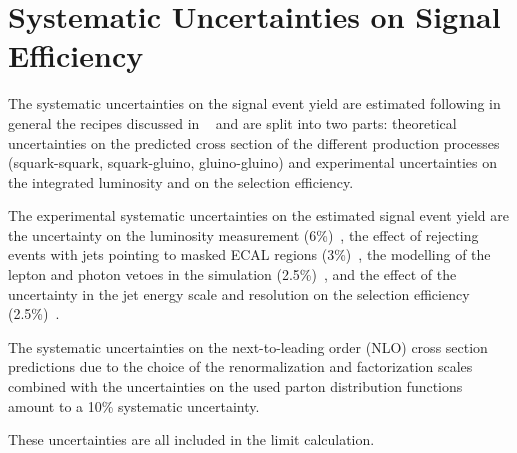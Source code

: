 \section{Systematic Uncertainties on Signal Efficiency \label{sec:systematics}}



The systematic uncertainties on the signal event yield are estimated following in general the recipes discussed in ~\cite{RA1Paper} and are split
into two parts: theoretical uncertainties on the predicted
cross section of the different production processes (squark-squark,
squark-gluino, gluino-gluino) and experimental uncertainties on
the integrated luminosity and on the selection efficiency.

The experimental systematic uncertainties on the estimated signal event yield are the uncertainty on the
luminosity measurement (6\%)~\cite{ref:lumi}, the effect of rejecting
events with jets pointing to masked ECAL regions (3\%)~\cite{RA1Paper}, the modelling of
the lepton and photon vetoes in the simulation (2.5\%)~\cite{RA1Paper}, and the effect of 
the uncertainty in the jet energy scale and resolution on the selection 
efficiency (2.5\%)~\cite{RA1Paper,PAS-JME-10-010}. 

The systematic uncertainties on the next-to-leading order
(NLO) cross section predictions due to the choice of the 
renormalization and factorization scales combined with the 
uncertainties on the used parton distribution functions amount to a 10\% systematic uncertainty.

These uncertainties are all included in the limit calculation.